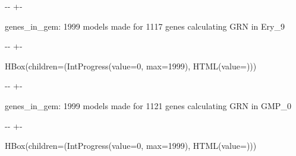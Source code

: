 \documentclass[letterpaper,10pt,english]{sphinxmanual}
\newlength\nbsphinxcodecellspacing
\begin{document}
%
{
\kern-\sphinxverbatimsmallskipamount\kern-\baselineskip
\kern+\FrameHeightAdjust\kern-\fboxrule
\vspace{\nbsphinxcodecellspacing}
%
\begin{sphinxVerbatim}[commandchars=\\\{\}]

genes\_in\_gem: 1999
models made for 1117 genes
calculating GRN in Ery\_9
\end{sphinxVerbatim}
}
\relax

{

\kern-\sphinxverbatimsmallskipamount\kern-\baselineskip
\kern+\FrameHeightAdjust\kern-\fboxrule
\vspace{\nbsphinxcodecellspacing}

%
\begin{sphinxVerbatim}[commandchars=\\\{\}]
HBox(children=(IntProgress(value=0, max=1999), HTML(value=\PYGZsq{}\PYGZsq{})))
\end{sphinxVerbatim}
}



%
{
\kern-\sphinxverbatimsmallskipamount\kern-\baselineskip
\kern+\FrameHeightAdjust\kern-\fboxrule
\vspace{\nbsphinxcodecellspacing}
%
\begin{sphinxVerbatim}[commandchars=\\\{\}]

genes\_in\_gem: 1999
models made for 1121 genes
calculating GRN in GMP\_0
\end{sphinxVerbatim}
}
\relax

{

\kern-\sphinxverbatimsmallskipamount\kern-\baselineskip
\kern+\FrameHeightAdjust\kern-\fboxrule
\vspace{\nbsphinxcodecellspacing}

%
\begin{sphinxVerbatim}[commandchars=\\\{\}]
HBox(children=(IntProgress(value=0, max=1999), HTML(value=\PYGZsq{}\PYGZsq{})))
\end{sphinxVerbatim}
}
\end{document}
